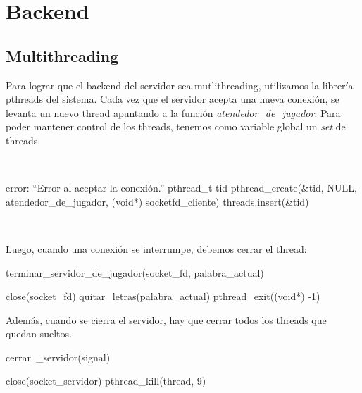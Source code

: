 \section{Backend}

\subsection{Multithreading}

Para lograr que el backend del servidor sea mutlithreading, utilizamos la librería pthreads del sistema. Cada vez que el servidor acepta una nueva conexión, se levanta un nuevo thread apuntando a la función \textit{atendedor\_de\_jugador}. Para poder mantener control de los threads, tenemos como variable global un \textit{set} de threads.

\ 
\begin{algorithmic}
  \STATE error: ``Error al aceptar la conexión.''
\ELSE
  \STATE pthread\_t tid
  \STATE pthread\_create(\&tid, NULL, atendedor\_de\_jugador, (void*) socketfd\_cliente)
  \STATE threads.insert(\&tid)
\ENDIF
\end{algorithmic}
\

Luego, cuando una conexión se interrumpe, debemos cerrar el thread:
\
\begin{algorithm}[H]
\caption{terminar\_servidor\_de\_jugador(socket\_fd, palabra\_actual)}
\begin{algorithmic}[1]
\STATE close(socket\_fd)
\STATE quitar\_letras(palabra\_actual)
\STATE pthread\_exit((void*) -1)
\end{algorithmic}
\end{algorithm}

Además, cuando se cierra el servidor, hay que cerrar todos los threads que quedan sueltos.
\
\begin{algorithm}[H]
\caption{cerrar\ _servidor(signal)}
\begin{algorithmic}
\STATE close(socket\_servidor)
\FOR{thread \textbf{en} threads}
  \STATE pthread\_kill(thread, 9)
\ENDFOR
\end{algorithmic}
\end{algorithm}
